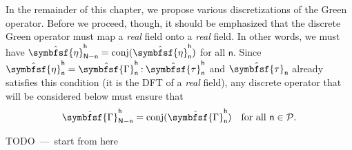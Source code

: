 \documentclass[draft, appendixprefix=true, chapterprefix=true, fontsize=12pt, numbers=noendperiod]{scrbook}
\newcommand{\cellindices}{\mathcal P}
\DeclareMathOperator{\conj}{conj}
\newcommand{\dbldot}{\mathbin{\mathord{:}}}
\newcommand{\tens}[1]{\symbfsf{#1}}
\newcommand{\todo}[1]{\color{red}TODO~---~#1\color{black}}
\newcommand{\tuple}[1]{\mathsf{#1}}
\begin{document}
\bigskip

In the remainder of this chapter, we propose various discretizations of the
Green operator. Before we proceed, though, it should be emphasized that the
discrete Green operator must map a \emph{real} field onto a \emph{real}
field. In other words, we must have
\(\hat{\tens\eta}_{\tuple N-\tuple n}^{\tuple h}=\conj(\hat{\tens\eta}_{\tuple
  n}^{\tuple h})\) for all \(\tuple n\). Since
\(\hat{\tens\eta}_{\tuple n}^{\tuple h} =\hat{\tens\Gamma}_{\tuple n}^{\tuple
  h}\dbldot \hat{\tens\tau}_{\tuple n}^{\tuple h}\) and
\(\hat{\tens\tau}_{\tuple n}\) already satisfies this condition (it is the DFT
of a \emph{real} field), any discrete operator that will be considered below
must ensure that
\begin{equation}
  \hat{\tens\Gamma}_{\tuple N-\tuple n}^{\tuple h}=\conj(\hat{\tens\Gamma}_{\tuple
    n}^{\tuple h})\quad\text{for all }\tuple n\in\cellindices.
\end{equation}

\todo{start from here}
\end{document}

